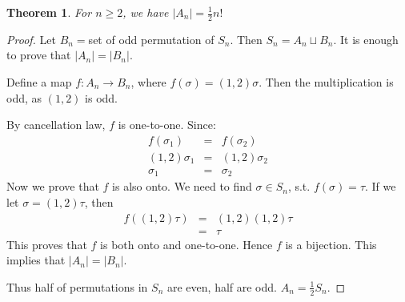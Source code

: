 \documentclass{article}
\theoremstyle{MyNonumberplain}
\theoremstyle{break}
\newtheorem*{proof}{Proof. }
\theoremstyle{break}
\newtheorem{theorem}{Theorem}[section]
\theoremstyle{break}
\theoremstyle{definition}
\theoremstyle{break}
\begin{document}
\begin{thmbox}
    \begin{theorem}
        For $n \geq 2$, we have $| A_n | = \frac{1}{2} n!$
    \end{theorem}
    \begin{prfbox}
        \begin{proof}
            Let $B_n =$set of odd permutation of $S_n$. Then $S_n = A_n  \sqcup B_n$. It
            is enough to prove that $| A_n | = | B_n |$.\bigskip

            Define a map $f : A_n \rightarrow B_n$, where $f (\sigma) = (1, 2) \sigma$.
            Then the multiplication is odd, as $(1, 2)$ is odd.\bigskip

            By cancellation law, $f$ is one-to-one. Since:
            \begin{eqnarray*}
            f (\sigma_1) & = & f (\sigma_2)\\
            (1, 2) \sigma_1 & = & (1, 2) \sigma_2\\
            \sigma_1 & = & \sigma_2
            \end{eqnarray*}
            Now we prove that $f$ is also onto. We need to find $\sigma \in S_n$, s.t. $f
            (\sigma) = \tau$. If we let $\sigma = (1, 2) \tau$, then
            \begin{eqnarray*}
            f ((1, 2) \tau) & = & (1, 2) (1, 2) \tau\\
            & = & \tau
            \end{eqnarray*}
            This proves that $f$ is both onto and one-to-one. Hence $f$ is a bijection.
            This implies that $| A_n | = | B_n |$.\bigskip

            Thus half of permutations in $S_n$ are even, half are odd. $A_n = \frac{1}{2}
            S_n$.
        \end{proof}
    \end{prfbox}
\end{thmbox}
\end{document}
